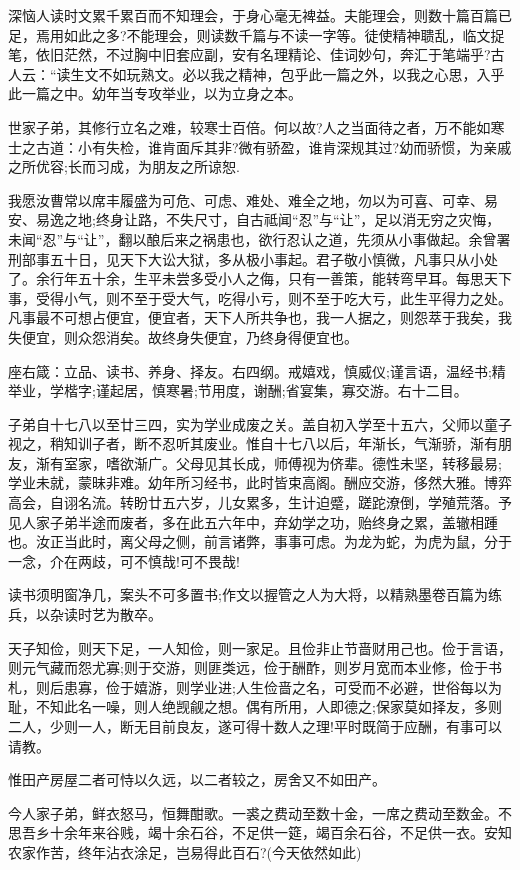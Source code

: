 \documentclass[letterpaper,12pt,english]{sphinxmanual}
\begin{document}
深恼人读时文累千累百而不知理会，于身心毫无裨益。夫能理会，则数十篇百篇已足，焉用如此之多?不能理会，则读数千篇与不读一字等。徒使精神聩乱，临文捉笔，依旧茫然，不过胸中旧套应副，安有名理精论、佳词妙句，奔汇于笔端乎?古人云：“读生文不如玩熟文。必以我之精神，包乎此一篇之外，以我之心思，入乎此一篇之中。幼年当专攻举业，以为立身之本。

世家子弟，其修行立名之难，较寒士百倍。何以故?人之当面待之者，万不能如寒士之古道：小有失检，谁肯面斥其非?微有骄盈，谁肯深规其过?幼而骄惯，为亲戚之所优容;长而习成，为朋友之所谅恕.

我愿汝曹常以席丰履盛为可危、可虑、难处、难全之地，勿以为可喜、可幸、易安、易逸之地;终身让路，不失尺寸，自古祗闻“忍”与“让”，足以消无穷之灾悔，未闻“忍”与“让”，翻以酿后来之祸患也，欲行忍认之道，先须从小事做起。余曾署刑部事五十日，见天下大讼大狱，多从极小事起。君子敬小慎微，凡事只从小处了。余行年五十余，生平未尝多受小人之侮，只有一善策，能转弯早耳。每思天下事，受得小气，则不至于受大气，吃得小亏，则不至于吃大亏，此生平得力之处。凡事最不可想占便宜，便宜者，天下人所共争也，我一人据之，则怨萃于我矣，我失便宜，则众怨消矣。故终身失便宜，乃终身得便宜也。

座右箴：立品、读书、养身、择友。右四纲。戒嬉戏，慎威仪;谨言语，温经书;精举业，学楷字;谨起居，慎寒暑;节用度，谢酬;省宴集，寡交游。右十二目。

子弟自十七八以至廿三四，实为学业成废之关。盖自初入学至十五六，父师以童子视之，稍知训子者，断不忍听其废业。惟自十七八以后，年渐长，气渐骄，渐有朋友，渐有室家，嗜欲渐广。父母见其长成，师傅视为侪辈。德性未坚，转移最易;学业未就，蒙昧非难。幼年所习经书，此时皆束高阁。酬应交游，侈然大雅。博弈高会，自诩名流。转盼廿五六岁，儿女累多，生计迫蹙，蹉跎潦倒，学殖荒落。予见人家子弟半途而废者，多在此五六年中，弃幼学之功，贻终身之累，盖辙相踵也。汝正当此时，离父母之侧，前言诸弊，事事可虑。为龙为蛇，为虎为鼠，分于一念，介在两歧，可不慎哉!可不畏哉!

读书须明窗净几，案头不可多置书;作文以握管之人为大将，以精熟墨卷百篇为练兵，以杂读时艺为散卒。

天子知俭，则天下足，一人知俭，则一家足。且俭非止节啬财用己也。俭于言语，则元气藏而怨尤寡;则于交游，则匪类远，俭于酬酢，则岁月宽而本业修，俭于书札，则后患寡，俭于嬉游，则学业进;人生俭啬之名，可受而不必避，世俗每以为耻，不知此名一噪，则人绝觊觎之想。偶有所用，人即德之;保家莫如择友，多则二人，少则一人，断无目前良友，遂可得十数人之理!平时既简于应酬，有事可以请教。

惟田产房屋二者可恃以久远，以二者较之，房舍又不如田产。

今人家子弟，鲜衣怒马，恒舞酣歌。一裘之费动至数十金，一席之费动至数金。不思吾乡十余年来谷贱，竭十余石谷，不足供一筵，竭百余石谷，不足供一衣。安知农家作苦，终年沾衣涂足，岂易得此百石?(今天依然如此)
\end{document}
